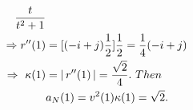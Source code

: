 \documentclass[11pt]{amsbook}
\begin{document}
\begin{exmp}
\begin{hSolution}
\begin{hEnumerateAlpha}
\begin{align*}
                                        \frac
                                        {t}
                                        {t^2+1}\\
        \Rightarrow r''(1) &= 
            [(-i+j)
                \frac
                {1}
                {2}]
                    \frac
                    {1}
                    {2} = 
                        \frac
                        {1}
                        {4}(-i+j)\\
        \Rightarrow  \ 
            \kappa(1) &= 
                \hAbs
                {r''(1)} = 
                    \frac
                    {\sqrt{2}}
                    {4}.\ Then\\ 
        &a_N(1) = v^2(1)
            \kappa(1) = 
                \sqrt{2}.
        \end{align*}
    	\end{hEnumerateAlpha}
	\end{hSolution}
    \end{exmp}
    
    
\end{document}
